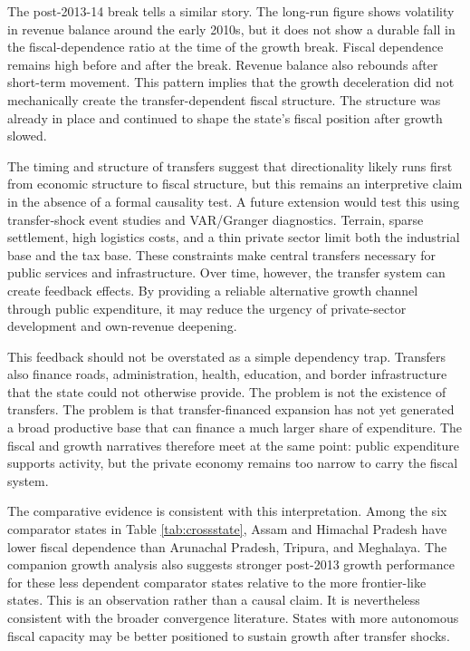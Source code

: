 \documentclass[11pt,a4paper]{article}
\begin{document}
The post-2013-14 break tells a similar story. The long-run figure shows volatility in revenue balance around the early 2010s, but it does not show a durable fall in the fiscal-dependence ratio at the time of the growth break. Fiscal dependence remains high before and after the break. Revenue balance also rebounds after short-term movement. This pattern implies that the growth deceleration did not mechanically create the transfer-dependent fiscal structure. The structure was already in place and continued to shape the state's fiscal position after growth slowed.

The timing and structure of transfers suggest that directionality likely runs first from economic structure to fiscal structure, but this remains an interpretive claim in the absence of a formal causality test. A future extension would test this using transfer‑shock event studies and VAR/Granger diagnostics. Terrain, sparse settlement, high logistics costs, and a thin private sector limit both the industrial base and the tax base. These constraints make central transfers necessary for public services and infrastructure. Over time, however, the transfer system can create feedback effects. By providing a reliable alternative growth channel through public expenditure, it may reduce the urgency of private-sector development and own-revenue deepening.

This feedback should not be overstated as a simple dependency trap. Transfers also finance roads, administration, health, education, and border infrastructure that the state could not otherwise provide. The problem is not the existence of transfers. The problem is that transfer-financed expansion has not yet generated a broad productive base that can finance a much larger share of expenditure. The fiscal and growth narratives therefore meet at the same point: public expenditure supports activity, but the private economy remains too narrow to carry the fiscal system.

The comparative evidence is consistent with this interpretation. Among the six comparator states in Table \ref{tab:crossstate}, Assam and Himachal Pradesh have lower fiscal dependence than Arunachal Pradesh, Tripura, and Meghalaya. The companion growth analysis also suggests stronger post-2013 growth performance for these less dependent comparator states relative to the more frontier-like states. This is an observation rather than a causal claim. It is nevertheless consistent with the broader convergence literature. States with more autonomous fiscal capacity may be better positioned to sustain growth after transfer shocks.
\end{document}
